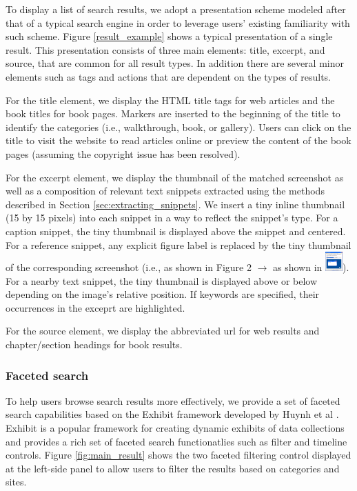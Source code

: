 \documentclass{www2010-submission}
\begin{document}

To display a list of search results, we adopt a presentation scheme 
modeled after that of a typical search engine in order to 
leverage users' existing familiarity with such scheme.  Figure
\ref{result_example} shows a typical presentation of a single
result. This presentation consists of three main elements: title,
excerpt, and source, that are common for all result types. In addition
there are several minor elements such as tags and actions that
are dependent on the types of results.

For the title element, we display the HTML title tags for web articles
and the book titles for book pages. Markers are inserted
to the beginning of the title to identify the categories (i.e.,
walkthrough, book, or gallery). Users can click on the title to
visit the website to read articles online or preview the content of
the book pages (assuming the copyright issue has been resolved).

For the excerpt element, we display the thumbnail of the matched
screenshot as well as a composition of relevant text snippets
extracted using the methods described in Section
\ref{sec:extracting_snippets}. We insert a tiny inline thumbnail (15
by 15 pixels) into each snippet in a way to reflect the snippet's
type. For a caption snippet, the tiny thumbnail is displayed above the
snippet and centered. For a reference snippet, any explicit figure
label is replaced by the tiny thumbnail of the corresponding
screenshot (i.e., as shown in Figure 2 $\rightarrow$ as shown in
\includegraphics{figure/tiny.png}). For a nearby text snippet, the
tiny thumbnail is displayed above or below depending on the image's
relative position. If keywords are specified, their occurrences in the
exceprt are highlighted.

For the source element, we display the abbreviated url for web
results and chapter/section headings for book results.


\subsubsection{Faceted search}

To help users browse search results more effectively, we provide a set
of faceted search capabilities based on the Exhibit framework
developed by Huynh et al \cite{Huynh}. Exhibit is a popular framework for
creating dynamic exhibits of data collections and provides a rich set
of faceted search functionatlies such as filter and timeline
controls. Figure \ref{fig:main_result} shows the two faceted filtering
control displayed at the left-side panel to allow users to filter the results
based on categories and sites.
\end{document}
